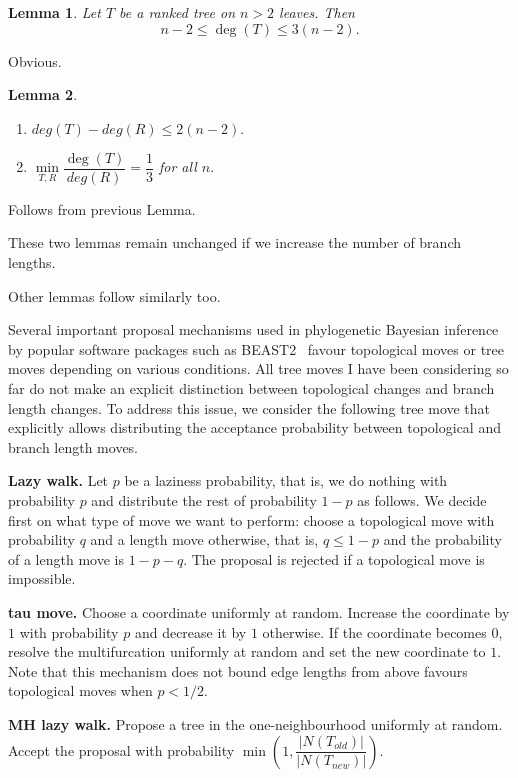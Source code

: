 \documentclass{amsart}
\newtheorem{lemma}{Lemma}
\begin{document}
\begin{lemma}
Let $T$ be a ranked tree on $n>2$ leaves. Then \[n-2\leq \deg(T)\leq3(n-2).\] 
\end{lemma}

\proof
Obvious.
\endproof

\begin{lemma}
\begin{enumerate}[(1)]
\item $deg(T)-deg(R) \leq 2(n-2).$
\item $\min\limits_{T,R}\dfrac{\deg(T)}{deg(R)} = \dfrac13$ for all $n.$
\end{enumerate}
\end{lemma}

\proof
Follows from previous Lemma. 
\endproof

These two lemmas remain unchanged if we increase the number of branch lengths. 

Other lemmas follow similarly too. 

Several important proposal mechanisms used in phylogenetic Bayesian inference by 
popular software packages such as BEAST2~\cite{beast2} favour topological moves
or tree moves depending on various conditions. All tree moves I have been 
considering so far do not make an explicit distinction between topological 
changes and branch length changes. To address this issue, we consider the
following tree move that explicitly allows distributing the acceptance 
probability between topological and branch length moves. 

{\bf Lazy walk.} Let $p$ be a laziness probability, that is, we do nothing 
with probability $p$ and distribute the rest of probability $1-p$ as follows. 
We decide first on what type of move we want to perform: choose a topological 
move with probability $q$ and a length move otherwise, that is, $q \leq 1-p$
and the probability of a length move is $1-p-q$. The proposal is rejected if
a topological move is impossible. 

{\bf tau move.} Choose a coordinate uniformly at random. Increase the
coordinate by $1$ with probability $p$ and decrease it by $1$ otherwise.
If the coordinate becomes $0$, resolve the multifurcation uniformly at
random and set the new coordinate to $1$. Note that this mechanism 
does not bound edge lengths from above favours topological moves when 
$p<1/2$. 

{\bf MH lazy walk.} Propose a tree in the one-neighbourhood uniformly at random. 
Accept the proposal with probability 
$\min(1, \dfrac{|N(T_{old})|}{|N(T_{new})|})$. 



\end{document}
